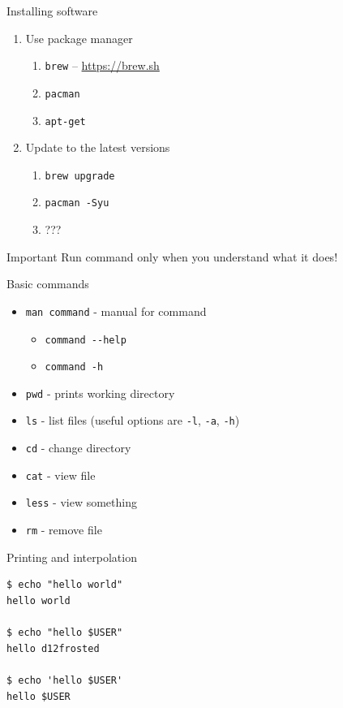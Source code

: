 \documentclass[presentation,aspectratio=169,smaller]{beamer}
\begin{document}
\begin{frame}[label={sec:org02fb53c},fragile]{Installing software}
 \begin{enumerate}
\item Use package manager
\begin{enumerate}
\item \texttt{brew} -- \url{https://brew.sh}
\item \texttt{pacman}
\item \texttt{apt-get}
\end{enumerate}
\item Update to the latest versions
\begin{enumerate}
\item \texttt{brew upgrade}
\item \texttt{pacman -Syu}
\item ???
\end{enumerate}
\end{enumerate}
\end{frame}

\begin{frame}[label={sec:org9839e79}]{Important}
Run command only when you understand what it does!
\end{frame}

\begin{frame}[label={sec:orgfe41e6b},fragile]{Basic commands}
 \begin{itemize}
\item \texttt{man command} - manual for command
\begin{itemize}
\item \texttt{command -{}-help}
\item \texttt{command -h}
\end{itemize}
\item \texttt{pwd} - prints working directory
\item \texttt{ls} - list files (useful options are \texttt{-l}, \texttt{-a}, \texttt{-h})
\item \texttt{cd} - change directory
\item \texttt{cat} - view file
\item \texttt{less} - view something
\item \texttt{rm} - remove file
\end{itemize}
\end{frame}

\begin{frame}[label={sec:org9d059df},fragile]{Printing and interpolation}
 \begin{verbatim}
$ echo "hello world"
hello world

$ echo "hello $USER"
hello d12frosted

$ echo 'hello $USER'
hello $USER
\end{verbatim}
\end{frame}
\end{document}
